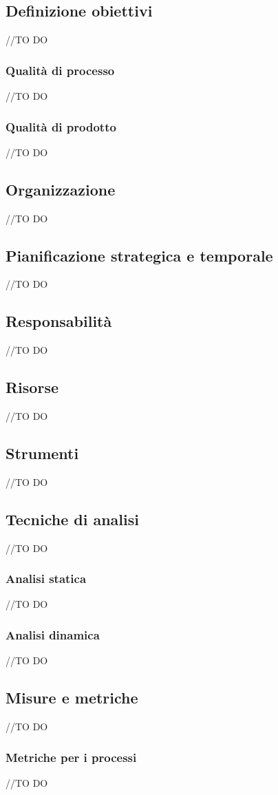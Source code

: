 \documentclass[12pt,a4paper]{article}
\begin{document}
\subsection{Definizione obiettivi}
//TO DO \AB
\subsubsection{Qualità di processo}
//TO DO \AB
\subsubsection{Qualità di prodotto}
//TO DO \AB
\subsection{Organizzazione}
//TO DO \AB
\subsection{Pianificazione strategica e temporale}
//TO DO \AB
\subsection{Responsabilità}
//TO DO \AB
\subsection{Risorse}
//TO DO \AB
\subsection{Strumenti}
//TO DO \AB
\subsection{Tecniche di analisi}
//TO DO \AB
\subsubsection{Analisi statica}
//TO DO \AVI
\subsubsection{ Analisi dinamica}
//TO DO \AVI
\subsection{Misure e metriche}
//TO DO \AVI
\subsubsection{Metriche per i processi}
//TO DO \AVI
\end{document}
